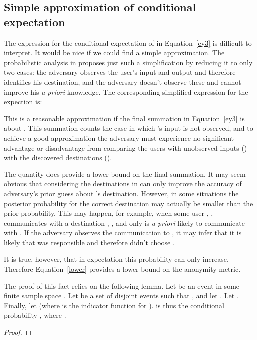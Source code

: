 \documentclass[prodmode,acmtissec]{acmsmall}
\begin{document}
\subsection{ Simple approximation of conditional expectation}
The expression for the conditional expectation of  in Equation~\ref{ey3} is difficult to interpret.  It would be nice if we could find a simple approximation.  The probabilistic analysis in  proposes just such a simplification by reducing it to only two cases:  the adversary observes the user's input and output and therefore identifies his destination, and  the adversary doesn't observe these and cannot improve his \emph{a priori} knowledge.  The corresponding simplified expression for the expection is:

This is a reasonable approximation if the final summation in Equation~\ref{ey3} is about .  This summation counts the case in which 's input is not observed, and to achieve a good approximation the adversary must experience no significant advantage or disadvantage from comparing the users with unobserved inputs () with the discovered destinations ().

The quantity  does provide a lower bound on the final summation.  It may seem obvious that considering the destinations in  can only improve the accuracy of adversary's prior guess about 's destination.  However, in some situations the posterior probability for the correct destination may actually be smaller than the prior probability.  This may happen, for example, when some user , , communicates with a destination , , and only  is \emph{a priori} likely to communicate with .  If the adversary observes the communication to , it may infer that it is likely that  was responsible and therefore didn't choose .

It is true, however, that in expectation this probability can only increase.  Therefore Equation~\ref{lower} provides a lower bound on the anonymity metric.

The proof of this fact relies on the following lemma.  Let  be an event in some finite sample space .  Let  be a set of disjoint events such that , and let .  Let .  Finally, let  (where  is the indicator function for ).  is thus the conditional probability , where .

\begin{lemma} \label{minlem}

\end{lemma}
\begin{proof}

\end{proof}
\end{document}
